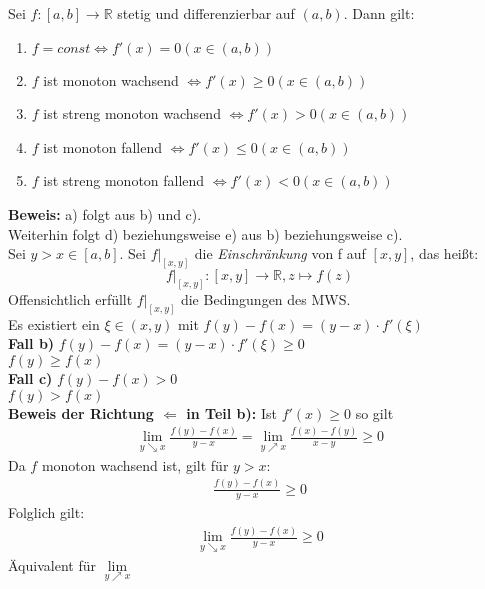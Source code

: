 \begin{Satz}{
	\label{satz_11}
	Sei $f:[a,b] \rightarrow \mathbb{R}$ stetig und differenzierbar auf $(a,b)$. 
	Dann gilt:
	\renewcommand{\labelenumi}{\alph{enumi})}
	\begin{enumerate}
		\item $f = const \Leftrightarrow f'(x) = 0 (x\in(a,b))$
		\item $f$ ist monoton wachsend $\Leftrightarrow f'(x) \geq 0 (x \in (a,b))$
		\item $f$ ist streng monoton wachsend $\Leftrightarrow f'(x) > 0 (x \in (a,b
		))$
		\item $f$ ist monoton fallend $\Leftrightarrow f'(x) \leq 0 (x \in (a,b))$
		\item $f$ ist streng monoton fallend $\Leftrightarrow f'(x) < 0 
		(x \in (a,b))$ 
	\end{enumerate}
	\textbf{Beweis:} a) folgt aus b) und c). \\
	Weiterhin folgt d) beziehungsweise e) aus b) beziehungsweise c). \\
	Sei $ y > x \in [a,b]$. Sei $f|_{[x,y]}$ die \textit{Einschränkung} 
	von f auf $[x,y]$, das heißt: 
	\begin{equation*}
		f|_{[x,y]} : [x,y] \rightarrow \mathbb{R}, z \mapsto f(z)
	\end{equation*}
	Offensichtlich erfüllt $f|_{[x,y]}$ die Bedingungen des MWS. \\
	Es existiert 
	ein $\xi \in (x,y)$ mit $f(y)-f(x) = (y-x)\cdot f'(\xi)$\\
	\textbf{Fall b)} $f(y)-f(x) = (y-x)\cdot f'(\xi) \geq 0$ \\
	\hspace*{1.5cm} $f(y) \geq f(x) $ \\
	\textbf{Fall c)} $f(y)-f(x) > 0$ \\
	\hspace*{1.5cm}$f(y) > f(x)$ \\
	\textbf{Beweis der Richtung $\Leftarrow$ in Teil b):} Ist $f'(x) \geq 0$ so gilt
	\begin{align*}
		\lim\limits_{y \searrow x}{\frac{f(y)-f(x)}{y-x}}
		=\lim\limits_{y \nearrow x}{\frac{f(x) -f(y)}{x-y}} \geq 0
	\end{align*}
	Da $f$ monoton wachsend ist, gilt für $y > x$: 
	\begin{align*}
		\frac{f(y)-f(x)}{y-x} \geq 0
	\end{align*}	 
	Folglich gilt: 
	\begin{align*}
		\lim\limits_{y \searrow x}{\frac{f(y)-f(x)}{y-x} } \geq 0
	\end{align*}
	Äquivalent für $\lim\limits_{y \nearrow x}{ }$ 
}\end{Satz}


